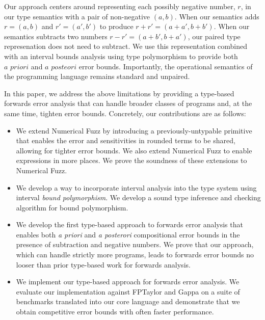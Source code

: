 Our approach centers around representing each possibly negative number, $r$, in
our type semantics with a pair of non-negative $(a, b)$. When our semantics adds
$r = (a, b)$ and $r' = (a', b')$ to produce $r + r' = (a + a', b + b')$. When
our semantics subtracts two numbers $r - r' = (a + b', b + a')$, our paired type
represenation does not need to subtract. We use this representation combined
with an interval bounds analysis using type polymorphism to provide both
$\textit{a priori}$ and $\textit{a posteori}$ error bounds. Importantly, the
operational semantics of the programming language remains standard and unpaired.

In this paper, we address the above limitations by providing a type-based
forwards error analysis that can handle broader classes of programs and, at the
same time, tighten error bounds. Concretely, our contributions are as follows:
\begin{itemize}
  \item We extend Numerical Fuzz by introducing a previously-untypable primitive
    that enables the error and sensitivities in rounded terms to be shared,
    allowing for tighter error bounds. We also extend Numerical Fuzz to enable
    expressions in more places. We prove the soundness of these extensions to
    Numerical Fuzz.

  \item We develop a way to incorporate interval analysis into the type system
    using interval \textit{bound polymorphism}. We develop a sound type
    inference and checking algorithm for bound polymorphism.

  \item We develop the first type-based approach to forwards error analysis that
    enables both \textit{a priori} and \textit{a posterori} compositional error
    bounds in the presence of subtraction and negative numbers. We prove that
    our approach, which can handle strictly more programs, leads to forwards
    error bounds no looser than prior type-based work for forwards analysis.

  \item We implement our type-based approach for forwards error analysis. We
    evaluate our implementation against FPTaylor and Gappa on a suite of
    benchmarks translated into our core language and demonstrate that we obtain
    competitive error bounds with often faster performance.
\end{itemize}
